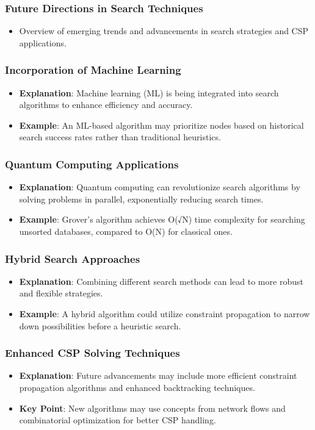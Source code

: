 \documentclass[aspectratio=169]{beamer}
\begin{document}
\begin{frame}[fragile]
    \frametitle{Future Directions in Search Techniques}
    \begin{itemize}
        \item Overview of emerging trends and advancements in search strategies and CSP applications.
    \end{itemize}
\end{frame}

\begin{frame}[fragile]
    \frametitle{Incorporation of Machine Learning}
    \begin{itemize}
        \item \textbf{Explanation}: Machine learning (ML) is being integrated into search algorithms to enhance efficiency and accuracy.
        \item \textbf{Example}: An ML-based algorithm may prioritize nodes based on historical search success rates rather than traditional heuristics. 
    \end{itemize}
\end{frame}

\begin{frame}[fragile]
    \frametitle{Quantum Computing Applications}
    \begin{itemize}
        \item \textbf{Explanation}: Quantum computing can revolutionize search algorithms by solving problems in parallel, exponentially reducing search times.
        \item \textbf{Example}: Grover's algorithm achieves O(√N) time complexity for searching unsorted databases, compared to O(N) for classical ones.
    \end{itemize}
\end{frame}

\begin{frame}[fragile]
    \frametitle{Hybrid Search Approaches}
    \begin{itemize}
        \item \textbf{Explanation}: Combining different search methods can lead to more robust and flexible strategies.
        \item \textbf{Example}: A hybrid algorithm could utilize constraint propagation to narrow down possibilities before a heuristic search.
    \end{itemize}
\end{frame}

\begin{frame}[fragile]
    \frametitle{Enhanced CSP Solving Techniques}
    \begin{itemize}
        \item \textbf{Explanation}: Future advancements may include more efficient constraint propagation algorithms and enhanced backtracking techniques.
        \item \textbf{Key Point}: New algorithms may use concepts from network flows and combinatorial optimization for better CSP handling.
    \end{itemize}
\end{frame}
\end{document}

